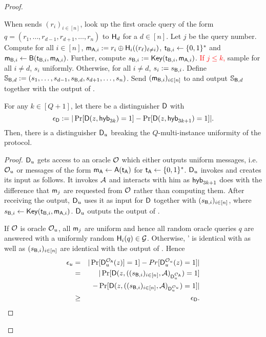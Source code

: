 \begin{proof}
\begin{description}
When \Adv sends $(r_i)_{i\in[n]}$, look up the first oracle query of the form $q= (r_1,\dots, r_{d-1},r_{d+1},\dots, r_{n})$ to $\mathsf{H}_d$ for a $d\in[n]$. Let $j$ be the query number. Compute for all $i\in[n]$, $\mathsf{m}_{\mathsf{A},i}:=r_i\oplus\mathsf{H}_i((r_\ell)_{\ell\neq i})$, $\mathsf{t}_{\mathsf{B},i}\leftarrow\{0,1\}^*$ and $\mathsf{m}_{\mathsf{B},i}\leftarrow\mathsf{B}(\mathsf{t}_{\mathsf{B},i},\mathsf{m}_{\mathsf{A},i})$. Further, compute $s_{\mathsf{B},i}:=\mathsf{Key}(\mathsf{t}_{\mathsf{B},i},\mathsf{m}_{\mathsf{A},i})$. \textcolor{red}{If $j\leq k$,} sample for all $i\neq d$, $s_i$ uniformly. Otherwise, for all $i\neq d$, $s_i:=s_{\mathsf{B},i}$.   Define $\mathsf{\mathbb S}_{\mathsf{B},d}:=(s_{1},\dots, s_{d-1},s_{\mathsf{B},d},s_{d+1},\dots, s_{n})$.  
 Send $(\mathsf{m}_{\mathsf{B},i})_{i\in[n]}$ to \Adv and output $\mathsf{\mathbb S}_{\mathsf{B},d}$ together with the output of \Adv. 
\end{description}

\begin{claim}\label{claim:first}
For any $k\in[Q+1]$, let there be a distinguisher $\mathsf D$ with
$$
\epsilon_{\mathsf D}:=|\Pr[\mathsf D(z,\mathsf{hyb}_{3k})=1] -\Pr[\mathsf D(z,\mathsf{hyb}_{3k+1})=1]|.
$$
Then, there is a distinguisher $\mathsf D_u$ breaking the $Q$-multi-instance uniformity of the \UKA protocol.
\end{claim}

\begin{proof}
 $\mathsf D_u$ gets access to an oracle $\mathcal{O}$ which either outputs uniform messages, i.e. $\mathcal{O}_u$ or messages of  the form $\mathsf{m}_\mathsf{A}\leftarrow\mathsf{A}(\mathsf{t}_\mathsf{A})$ for $\mathsf{t}_\mathsf{A}\leftarrow\{0,1\}^*$. $\mathsf D_u$ invokes \D and creates its input as follows. It invokes $\mathcal{A}$ and interacts with him as $\mathsf{hyb}_{3k+1}$ does with the difference that $\mathsf{m}_j$ are requested from $\mathcal{O}$ rather than computing them.  After receiving the output, $\mathsf D_u$ uses it as input for $\mathsf D$ together with $(s_{\mathsf{B},i})_{i\in[n]}$, where $s_{\mathsf{B},i}\leftarrow\mathsf{Key}(\mathsf{t}_{\mathsf{B},i},\mathsf{m}_{\mathsf{A},i})$. $\mathsf D_u$ outputs the output of \D. 

If $\mathcal{O}$ is oracle $\mathcal{O}_{u}$, all $\mathsf{m}_j$ are uniform and hence all random oracle queries $q$ are answered with a uniformly random $\mathsf{H}_i(q)\in\mathcal{G}$.  Otherwise, \Adv' is identical with \send as well as $(s_{\mathsf{B},i})_{i\in[n]}$ are identical with the output of \send.  
Hence 
\begin{eqnarray*}
\epsilon_{u}&=&|\Pr[\mathsf D_u^{\mathcal{O}_{\mathsf{A}}}(z)]=1]-Pr[\mathsf D_u^{\mathcal{O}_{u}}(z)=1]|\\
&= &|\Pr[\mathsf D(z,((s_{\mathsf{B},i})_{i\in[n]},\mathcal{A})_{\mathsf D_u^{\mathcal{O}_{\mathsf{A}}}})=1]\\
&&-\Pr[\mathsf D(z,((s_{\mathsf{B},i})_{i\in[n]},\mathcal{A})_{\mathsf D_u^{\mathcal{O}_{u}}})=1]|\\
&\geq&\epsilon_{\mathsf D}.
\end{eqnarray*}
\pe
\end{proof}



\end{proof}
